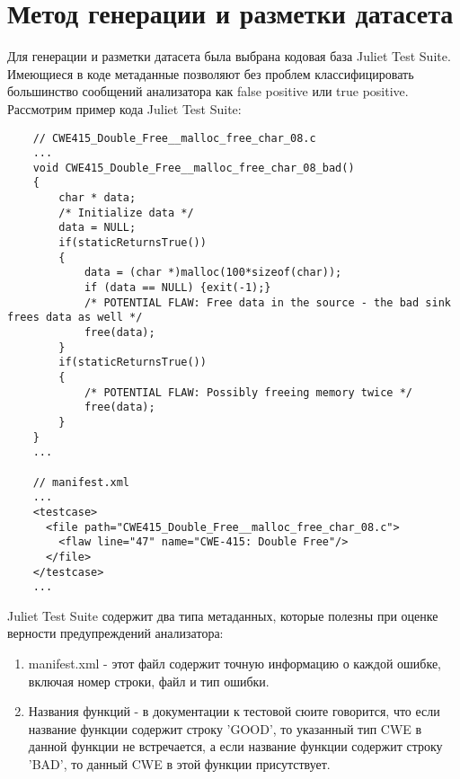 \section{Метод генерации и разметки датасета}
Для генерации и разметки датасета была выбрана кодовая база Juliet Test Suite\cite{Juliet}. Имеющиеся в коде метаданные позволяют без проблем классифицировать большинство сообщений анализатора как false positive или true positive. Рассмотрим пример кода Juliet Test Suite:

\begin{verbatim}
    // CWE415_Double_Free__malloc_free_char_08.c
    ...
    void CWE415_Double_Free__malloc_free_char_08_bad()
    {
        char * data;
        /* Initialize data */
        data = NULL;
        if(staticReturnsTrue())
        {
            data = (char *)malloc(100*sizeof(char));
            if (data == NULL) {exit(-1);}
            /* POTENTIAL FLAW: Free data in the source - the bad sink frees data as well */
            free(data);
        }
        if(staticReturnsTrue())
        {
            /* POTENTIAL FLAW: Possibly freeing memory twice */
            free(data);
        }
    }
    ...

    // manifest.xml
    ...
    <testcase>
      <file path="CWE415_Double_Free__malloc_free_char_08.c">
        <flaw line="47" name="CWE-415: Double Free"/>
      </file>
    </testcase>
    ...
\end{verbatim}

Juliet Test Suite содержит два типа метаданных, которые полезны при оценке верности предупреждений анализатора:
\begin{enumerate}
    \item manifest.xml - этот файл содержит точную информацию о каждой ошибке, включая номер строки, файл и тип ошибки.
    \item Названия функций - в документации к тестовой сюите говорится, что если название функции содержит строку 'GOOD', то указанный тип CWE в данной функции не встречается, а если название функции содержит строку 'BAD', то данный CWE в этой функции присутствует.
\end{enumerate}

